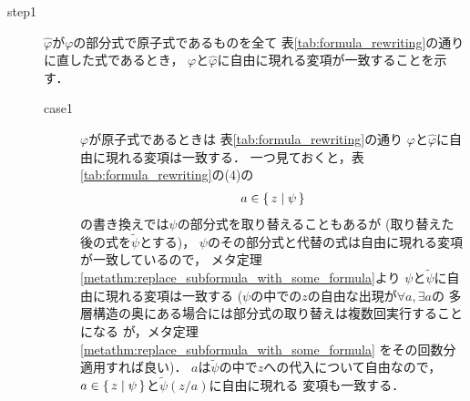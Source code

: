 	\begin{metaprf}\mbox{}
		\begin{description}
			\item[step1] $\widehat{\varphi}$が$\varphi$の部分式で原子式であるものを全て
				表\ref{tab:formula_rewriting}の通りに直した式であるとき，
				$\varphi$と$\widehat{\varphi}$に自由に現れる変項が一致することを示す．
				\begin{description}
					\item[case1] $\varphi$が原子式であるときは
						表\ref{tab:formula_rewriting}の通り
						$\varphi$と$\widehat{\varphi}$に自由に現れる変項は一致する．
						一つ見ておくと，表\ref{tab:formula_rewriting}の(4)の
						\begin{align}
							a \in \{\, z \mid \psi\, \}
						\end{align}
						の書き換えでは$\psi$の部分式を取り替えることもあるが
						(取り替えた後の式を$\widetilde{\psi}$とする)，
						$\psi$のその部分式と代替の式は自由に現れる変項が一致しているので，
						メタ定理\ref{metathm:replace_subformula_with_some_formula}より
						$\psi$と$\widetilde{\psi}$に自由に現れる変項は一致する
						($\psi$の中での$z$の自由な出現が$\forall a,\exists a$の
						多層構造の奥にある場合には部分式の取り替えは複数回実行することになる
						が，メタ定理\ref{metathm:replace_subformula_with_some_formula}
						をその回数分適用すれば良い)．
						$a$は$\widetilde{\psi}$の中で$z$への代入について自由なので，
						$a \in \{\, z \mid \psi\, \}$と$\tilde{\psi}(z/a)$に自由に現れる
						変項も一致する．
						

\end{description}
\end{description}
\end{metaprf}

